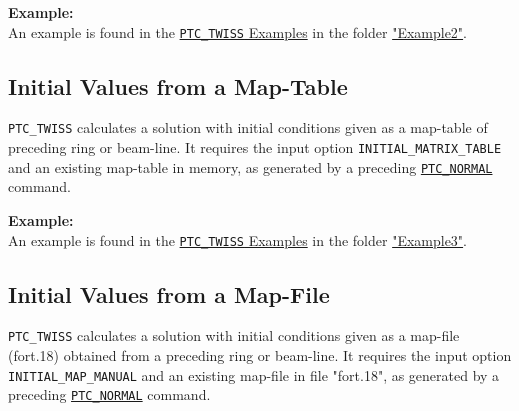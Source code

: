 \textbf{Example:} \\
An example is found in the
\href{http://madx.web.cern.ch/madx/madX/examples/ptc_twiss/}
{\texttt{PTC\_TWISS} Examples} 
in the folder
\href{http://madx.web.cern.ch/madx/madX/examples/ptc_twiss/Example2}
{"Example2"}.  


\subsection{Initial Values from a Map-Table}
\label{subsec:from-map-table}

\texttt{PTC\_TWISS} calculates a solution with initial conditions given
as a map-table of preceding ring or beam-line. It requires the input
option \texttt{INITIAL\_MATRIX\_TABLE} and an existing map-table
in memory, as generated by a preceding
\hyperref[sec:ptc-normal]{\texttt{PTC\_NORMAL}} command.  


\textbf{Example:} \\
An example is found in the
\href{http://madx.web.cern.ch/madx/madX/examples/ptc_twiss/}
{\texttt{PTC\_TWISS} Examples} in the folder
\href{http://madx.web.cern.ch/madx/madX/examples/ptc_twiss/Example3}
{"Example3"}. 


\subsection{Initial Values from a Map-File}
\label{subsec:from-map-file}

\texttt{PTC\_TWISS} calculates a solution with initial
conditions given as a map-file (fort.18) obtained from a
preceding ring or beam-line. It requires the input option
\texttt{INITIAL\_MAP\_MANUAL} and an existing map-file
in file "fort.18", as generated by a preceding
\hyperref[sec:ptc-normal]{\texttt{PTC\_NORMAL}} command. 


